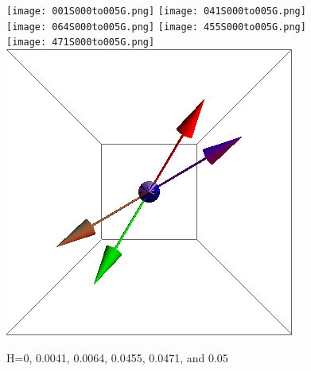 \documentclass{article}
\begin{document}
\begin{figure}[ht]
\centering
\texttt{[image: 001S000to005G.png]}
\texttt{[image: 041S000to005G.png]}
\texttt{[image: 064S000to005G.png]}
\texttt{[image: 455S000to005G.png]}
\texttt{[image: 471S000to005G.png]}
\includegraphics[scale=0.27]{501S000to005G.png}
\caption{H=0, 0.0041, 0.0064, 0.0455, 0.0471, and 0.05}
\end{figure}
\end{document}
